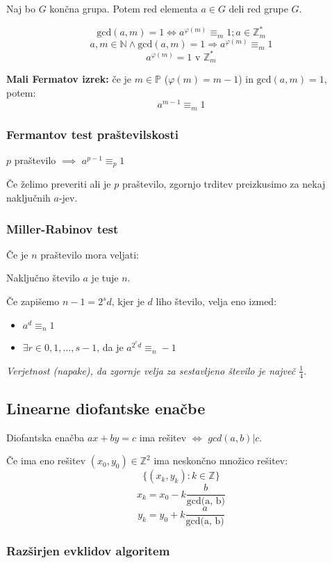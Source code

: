 \begin{multicols}{5}
Naj bo $G$ končna grupa. Potem red elementa $a \in G$ deli red grupe $G$.

\[\textrm{gcd}(a, m) = 1 \Leftrightarrow a^{\varphi(m)} \equiv_m 1; a \in \mathbb{Z}_m^*\]
\[a,m \in \mathbb{N} \wedge \textrm{gcd}(a, m) = 1 \Rightarrow a^{\varphi(m)} \equiv_m 1\]
\[a^{\varphi(m)} = 1 \text{ v } \mathbb{Z}_m^*\]

\textbf{Mali Fermatov izrek:} če je $m \in \mathbb{P}$ ($\varphi(m) = m-1$) in $\textrm{gcd}(a,m) = 1$, potem:
\[a^{m-1} \equiv_m 1\]

\subsubsection{Fermantov test praštevilskosti}
$p$ praštevilo $\implies$ $a^{p-1} \equiv_p 1$

Če želimo preveriti ali je $p$ praštevilo, zgornjo trditev preizkusimo za nekaj naključnih $a$-jev.

\subsubsection*{Miller-Rabinov test}
Če je $n$ praštevilo mora veljati:

Naključno število $a$ je tuje $n$.

Če zapišemo $n - 1 = 2^s d$, kjer je $d$ liho število, velja eno izmed:
\begin{itemize}
	\item $a^d \equiv_n 1$
	\item $\exists r \in {0,1,\dots, s-1}$, da je $a^{2^r d} \equiv_n -1$
\end{itemize}

\textit{Verjetnost (napake), da zgornje velja za sestavljeno število je največ $\frac{1}{4}$.}

\subsection{Linearne diofantske enačbe}
Diofantska enačba $ax + by = c$ ima rešitev $\Leftrightarrow$ $gcd(a, b) | c$. 

Če ima eno rešitev $(x_0, y_0) \in \mathbb{Z}^2$ ima neskončno množico rešitev:
\[\{(x_k, y_k) : k \in \mathbb{Z}\}\]
\[x_k = x_0 - k\frac{b}{\textrm{gcd(a, b)}}\]
\[y_k = y_0 + k\frac{a}{\textrm{gcd(a, b)}}\]

\subsubsection*{Razširjen evklidov algoritem}


\end{multicols}
